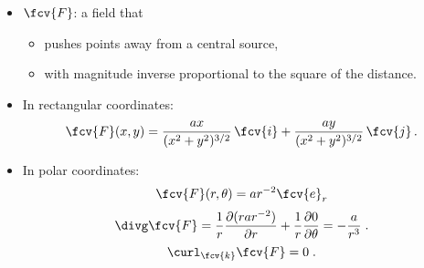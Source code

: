\begin{frame}
\small
   \begin{itemize}
     \item $\fcv{F}$: a field that
     \begin{itemize}
       \item pushes points away from a central source,
       \item with magnitude inverse proportional to the square of the distance.
     \end{itemize}

     \item \pause In rectangular coordinates:
%
$$\fcv{F}(x,y) = \frac{ax}{(x^2+y^2)^{3/2}}\, \fcv{i} + \frac{ay}{(x^2+y^2)^{3/2}} \, \fcv{j}\, .$$
%
\item \pause In polar coordinates:
%
$$\fcv{F}(r,\theta) = ar^{-2} \fcv{e}_r$$
%
$$\divg \fcv{F} = \frac{1}{r} \frac{\partial (r a r^{-2})}{\partial r} + \frac{1}{r} \frac{\partial 0}{\partial \theta} = -\frac{a}{r^3}\; .$$
%
$$\curl_{\fcv{k}} \fcv{F} = 0\; .$$
   \end{itemize}

\end{frame}